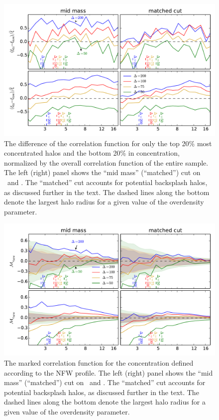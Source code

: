 \documentclass[usenatbib,usegraphicx,letterpaper]{mn2e}
\begin{document}
\begin{figure}
	\centering
	\includegraphics[width=.9\textwidth]{all_cfhilow_z00_hostsvmatch.pdf}
	\caption{The difference of the correlation function for only the top 20\% most concentrated halos and the bottom 20\% in concentration, normalized by the overall correlation function of the entire sample. The left (right) panel shows the ``mid mass'' (``matched'') cut on \simA \ and \simB. The ``matched'' cut accounts for potential backsplash halos, as discussed further in the text. The dashed lines along the bottom denote the largest halo radius for a given value of the overdensity parameter.}
	\label{fig:hvm_cfcompare}
\end{figure}

\begin{figure}
	\centering
	\includegraphics[width=.9\textwidth]{all_mcf_cnfw_z00_hostsvmatch.pdf}
	\caption{The marked correlation function for the concentration defined according to the NFW profile. The left (right) panel shows the ``mid mass'' (``matched'') cut on \simA \ and \simB. The ``matched'' cut accounts for potential backsplash halos, as discussed further in the text. The dashed lines along the bottom denote the largest halo radius for a given value of the overdensity parameter.}
	\label{fig:hvm_mcf_cnfw}
\end{figure}
\end{document}

